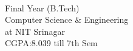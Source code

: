 
\begin{large}
    \\
\end{large}
Final Year (B.Tech)\\
Computer Science $\&$  Engineering\\
at NIT Srinagar \\
CGPA:8.039 till 7th Sem
\vspace{0.1cm}